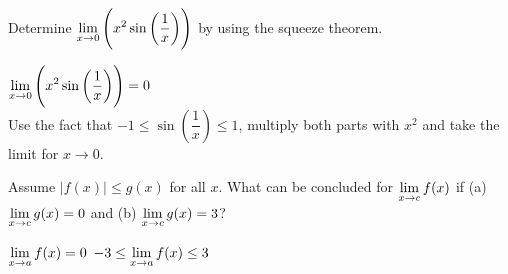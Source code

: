 \begin{Exercise}[difficulty = 1] Determine $\displaystyle\lim_{x\rightarrow 0} \left( x^2 \sin \left( \dfrac{1}{x} \right) \right) $ by using the squeeze theorem.

\end{Exercise}

\begin{Answer}\phantom{}
    $\displaystyle\lim_{x\rightarrow 0} \left( x^2 \sin \left( \dfrac{1}{x} \right) \right) = 0$ \\[0.2cm]
Use the fact that $-1 \leq \sin \left( \dfrac{1}{x} \right) \leq 1$, multiply both parts with $x^2$ and take the limit for $x \rightarrow 0$.
\end{Answer}

\ifanalysis
\begin{Exercise}[difficulty = 1] Assume $|f(x)| \leq g(x)$ for all $x$. What can be concluded for $\displaystyle\lim_{x\rightarrow c} f(x)$ if (a) $\displaystyle\lim_{x\rightarrow c} g(x)=0$ and (b) $\displaystyle\lim_{x\rightarrow c} g(x)=3$?  

\end{Exercise}

\begin{Answer}\phantom{}
    \begin{multicols}{2}
    
    \Question  $\displaystyle\lim_{x\rightarrow a} f(x) = 0$
    \Question  $-3 \leq \displaystyle\lim_{x\rightarrow a} f(x) \leq 3$
    \EndCurrentQuestion
    \end{multicols}
\end{Answer}
\fi

\subsection*{}



